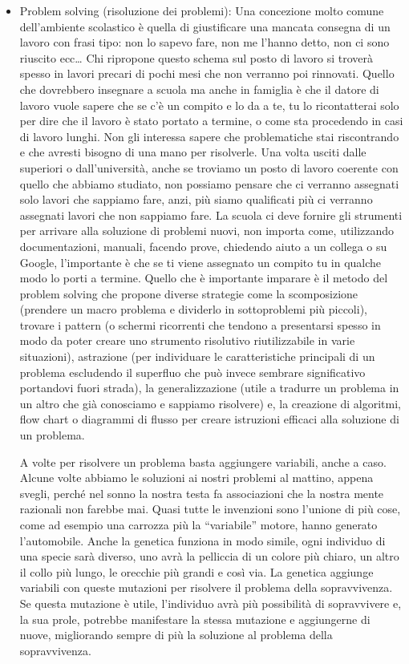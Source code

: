 \documentclass[12pt]{book} %
\begin{document}
\begin{itemize}
\item Problem solving (risoluzione dei problemi): Una concezione molto comune dell'ambiente
scolastico è quella di giustificare una mancata consegna di un lavoro con frasi tipo: non lo sapevo fare, non me
l'hanno detto, non ci sono riuscito ecc… Chi ripropone questo schema sul posto di lavoro si
troverà spesso in lavori precari di pochi mesi che non verranno poi rinnovati. Quello che dovrebbero insegnare a scuola
ma anche in famiglia è che il datore di lavoro vuole sapere che se c'è un compito e lo da a te, tu
lo ricontatterai solo per dire che il lavoro è stato portato a termine, o come sta procedendo in casi di lavoro lunghi.
Non gli interessa sapere che problematiche stai riscontrando e che avresti bisogno di una mano per risolverle. Una
volta usciti dalle superiori o dall'università, anche se troviamo un posto di lavoro coerente con
quello che abbiamo studiato, non possiamo pensare che ci verranno assegnati solo lavori che sappiamo fare, anzi, più
siamo qualificati più ci verranno assegnati lavori che non sappiamo fare. La scuola ci deve fornire gli strumenti per
arrivare alla soluzione di problemi nuovi, non importa come, utilizzando documentazioni, manuali, facendo prove,
chiedendo aiuto a un collega o su Google, l'importante è che se ti viene assegnato un compito tu
in qualche modo lo porti a termine. Quello che è importante imparare è il metodo del problem solving che propone
diverse strategie come la scomposizione (prendere un macro problema e dividerlo in sottoproblemi più piccoli), trovare
i pattern (o schermi ricorrenti che tendono a presentarsi spesso in modo da poter creare uno strumento risolutivo
riutilizzabile in varie situazioni), astrazione (per individuare le caratteristiche principali di un problema
escludendo il superfluo che può invece sembrare significativo portandovi fuori strada), la generalizzazione (utile a
tradurre un problema in un altro che già conosciamo e sappiamo risolvere) e, la creazione di algoritmi, flow chart o
diagrammi di flusso per creare istruzioni efficaci alla soluzione di un problema.

\begin{mdframed}[linewidth=1pt]
A volte per risolvere un problema basta aggiungere variabili, anche a caso. Alcune volte abbiamo le soluzioni ai nostri
problemi al mattino, appena svegli, perché nel sonno la nostra testa fa associazioni che la nostra mente razionali non
farebbe mai. Quasi tutte le invenzioni sono l'unione di più cose, come ad esempio una carrozza più
la “variabile” motore, hanno generato l'automobile. Anche la genetica funziona in modo simile,
ogni individuo di una specie sarà diverso, uno avrà la pelliccia di un colore più chiaro, un altro il collo più lungo,
le orecchie più grandi e così via. La genetica aggiunge variabili con queste mutazioni per risolvere il problema della
sopravvivenza. Se questa mutazione è utile, l'individuo avrà più possibilità di sopravvivere e, la
sua prole, potrebbe manifestare la stessa mutazione e aggiungerne di nuove, migliorando sempre di più la soluzione al
problema della sopravvivenza. 


\end{mdframed}
\end{itemize}
\end{document}
